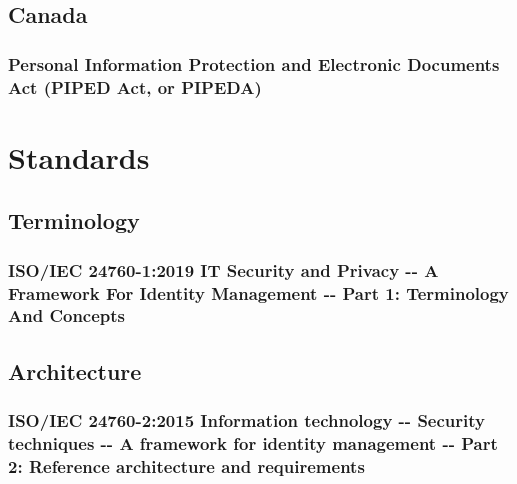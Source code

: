 \hypertarget{canada}{%
\subsection{Canada}\label{canada}}

\hypertarget{personal-information-protection-and-electronic-documents-act-piped-act-or-pipeda}{%
\subsubsection{Personal Information Protection and Electronic Documents Act
(PIPED Act, or
PIPEDA)}\label{personal-information-protection-and-electronic-documents-act-piped-act-or-pipeda}}

\hypertarget{standards}{%
\section{Standards}\label{standards}}

\hypertarget{terminology}{%
\subsection{Terminology}\label{terminology}}

\hypertarget{isoiec-24760-12019-it-security-and-privacy----a-framework-for-identity-management----part-1-terminology-and-concepts}{%
\subsubsection{ISO/IEC 24760-1:2019 IT Security and Privacy -\/- A Framework
For Identity Management -\/- Part 1: Terminology And
Concepts}\label{isoiec-24760-12019-it-security-and-privacy----a-framework-for-identity-management----part-1-terminology-and-concepts}}

\hypertarget{architecture}{%
\subsection{Architecture}\label{architecture}}

\hypertarget{isoiec-24760-22015-information-technology----security-techniques----a-framework-for-identity-management----part-2-reference-architecture-and-requirements}{%
\subsubsection{ISO/IEC 24760-2:2015 Information technology -\/- Security
techniques -\/- A framework for identity management -\/- Part 2:
Reference architecture and
requirements}\label{isoiec-24760-22015-information-technology----security-techniques----a-framework-for-identity-management----part-2-reference-architecture-and-requirements}}

